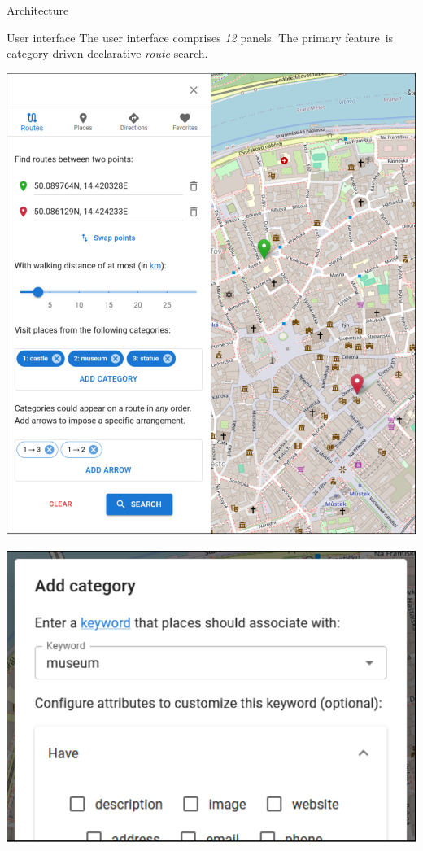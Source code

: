 \documentclass[portrait,a0paper,fontscale=0.25]{baposter}
\begin{document}
\begin{poster}
\begin{posterbox}[column=0, name=architecture, below=data]{Architecture}
\end{posterbox}

%
%

\begin{posterbox}[column=1, name=ui]{User interface}
The user interface comprises \emph{12} panels. The primary feature~is category-driven declarative \emph{route} search.

\vspace{0.5em}

\begin{minipage}{1.00\textwidth}
\begin{minipage}{0.49\textwidth}
\includegraphics[width=1.00\linewidth]{./img/poster/uc04-search-routes-config.pdf}
\end{minipage}
\hfill
\begin{minipage}{0.49\textwidth}
\centering
\includegraphics[width=0.65\linewidth]{./img/poster/configure-category.pdf} \\

\end{minipage}
\end{minipage}
\end{posterbox}
\end{poster}
\end{document}
